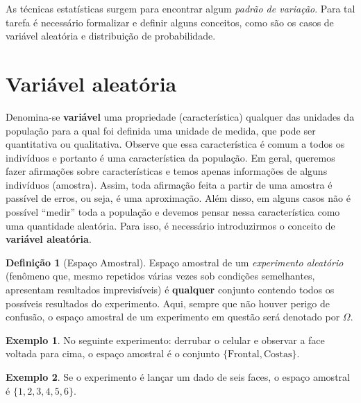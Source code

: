 \documentclass[
]{book}
\theoremstyle{definition}
\newtheorem{definition}{Definição}[chapter]
\theoremstyle{definition}
\newtheorem{example}{Exemplo}[chapter]
\theoremstyle{definition}
\theoremstyle{remark}
\begin{document}
As técnicas estatísticas surgem para encontrar algum \emph{padrão de variação}. Para tal tarefa é necessário formalizar e definir alguns conceitos, como são os casos de variável aleatória e distribuição de probabilidade.

\hypertarget{variuxe1vel-aleatuxf3ria}{%
\section{Variável aleatória}\label{variuxe1vel-aleatuxf3ria}}

Denomina-se \textbf{variável} uma propriedade (característica) qualquer das unidades da população para a qual foi definida uma unidade de medida, que pode ser quantitativa ou qualitativa. Observe que essa característica é comum a todos os indivíduos e portanto é uma característica da população. Em geral, queremos fazer afirmações sobre características e temos apenas informações de alguns indivíduos (amostra). Assim, toda afirmação feita a partir de uma amostra é passível de erros, ou seja, é uma aproximação. Além disso, em alguns casos não é possível ``medir'' toda a população e devemos pensar nessa característica como uma quantidade aleatória. Para isso, é necessário introduzirmos o conceito de \textbf{variável aleatória}.

\begin{definition}[Espaço Amostral]
\protect\hypertarget{def:EspacoAmostral}{}{\label{def:EspacoAmostral} {} }Espaço amostral de um \emph{experimento aleatório} (fenômeno que, mesmo repetidos várias vezes sob condições semelhantes, apresentam resultados imprevisíveis) é \textbf{qualquer} conjunto contendo todos os possíveis resultados do experimento. Aqui, sempre que não houver perigo de confusão, o espaço amostral de um experimento em questão será denotado por \(\Omega\).
\end{definition}

\begin{example}
\protect\hypertarget{exm:exampcel}{}{\label{exm:exampcel} }No seguinte experimento: derrubar o celular e observar a face voltada para cima, o espaço amostral é o conjunto \(\{\mathrm{Frontal}, \mathrm{Costas}\}\).
\end{example}

\begin{example}
\protect\hypertarget{exm:edados}{}{\label{exm:edados} }Se o experimento é lançar um dado de seis faces, o espaço amostral é \(\{1,2,3,4,5,6\}\).
\end{example}
\end{document}
